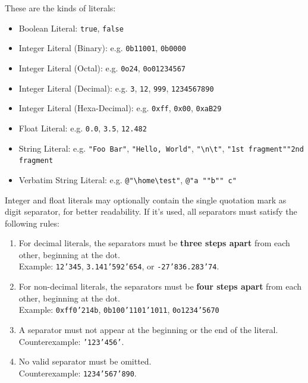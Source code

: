 \documentclass{report}
\begin{document}
These are the kinds of literals:
\begin{itemize}
	\item Boolean Literal: \texttt{true}, \texttt{false}
	\item Integer Literal (Binary): e.g. \texttt{0b11001}, \texttt{0b0000}
	\item Integer Literal (Octal): e.g. \texttt{0o24}, \texttt{0o01234567}
	\item Integer Literal (Decimal): e.g. \texttt{3}, \texttt{12}, \texttt{999}, \texttt{1234567890}
	\item Integer Literal (Hexa-Decimal): e.g. \texttt{0xff}, \texttt{0x00}, \texttt{0xaB29}
	\item Float Literal: e.g. \texttt{0.0}, \texttt{3.5}, \texttt{12.482}
	\item String Literal: e.g. \texttt{"Foo Bar"}, \texttt{"Hello, World"}, \texttt{"\textbackslash n\textbackslash t"},
		\texttt{"1st fragment"\textvisiblespace"2nd fragment}
	\item Verbatim String Literal: e.g. \texttt{@"\textbackslash home\textbackslash test"}, \texttt{@"a ""b"" c"}
\end{itemize}
Integer and float literals may optionally contain the single quotation mark as digit separator, for better readability.
If it's used, all separators must satisfy the following rules:
\begin{enumerate}
	\item For decimal literals, the separators must be \textbf{three steps apart} from each other, beginning at the dot. \\
		Example: \texttt{12'345}, \texttt{3.141'592'654}, or \texttt{-27'836.283'74}.
	\item For non-decimal literals, the separators must be \textbf{four steps apart} from each other, beginning at the dot. \\
		Example: \texttt{0xff0'214b}, \texttt{0b100'1101'1011}, \texttt{0o1234'5670}
	\item A separator must not appear at the beginning or the end of the literal. \\
		Counterexample: \texttt{'123'456'}.
	\item No valid separator must be omitted. \\
		Counterexample: \texttt{1234'567'890}.
\end{enumerate}


\end{document}
